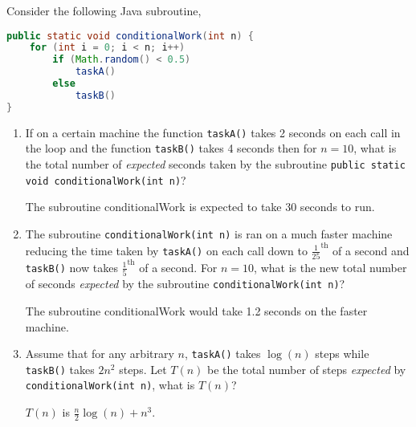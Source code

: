 \documentclass{homework}
\begin{document}
\question Consider the following Java subroutine,
\begin{lstlisting}[language=java]
public static void conditionalWork(int n) {
    for (int i = 0; i < n; i++)
        if (Math.random() < 0.5)
            taskA()
        else
            taskB()
}


\end{lstlisting}
\begin{enumerate}
  \item If on a certain machine the function \texttt{taskA()} takes 2
        seconds on each call in the loop and the function \texttt{taskB()}
        takes 4 seconds then for $n=10$, what is the total number of
        \textit{expected} seconds taken by the subroutine \texttt{public
          static void conditionalWork(int n)}?

        \begin{sol}
          The subroutine conditionalWork is expected to take 30 seconds to run.
        \end{sol}
        

  \item The subroutine \texttt{conditionalWork(int n)} is ran on a much
        faster machine reducing the time taken by \texttt{taskA()} on each
        call down to $\frac{1}{25}^\text{th}$ of a second and
        \texttt{taskB()} now takes $\frac{1}{5}^\text{th}$ of a second.
        For ${n=10}$, what is the new total number of seconds
        \textit{expected} by the subroutine \texttt{conditionalWork(int
          n)}?

        \begin{sol}
          The subroutine conditionalWork would take 1.2 seconds on the faster machine.
        \end{sol}
        

  \item Assume that for any arbitrary $n$, \texttt{taskA()} takes
        $\log(n)$ steps while \texttt{taskB()} takes $2n^2$ steps. Let
        $T(n)$ be the total number of steps \textit{expected} by
        \texttt{conditionalWork(int n)}, what is $T(n)$?

        \begin{sol}
          $T(n)$ is $\frac{n}{2}\log(n) + n^3$.
        \end{sol}


\end{enumerate}
\end{document}
